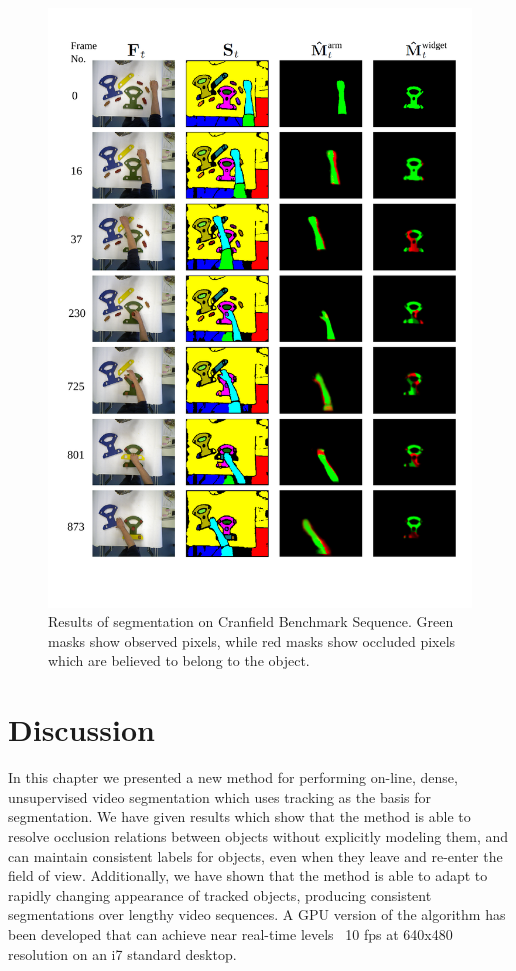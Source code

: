\begin{figure}[t]
\includegraphics[width=\linewidth]{figures/ECCV2012/Cranfield_Results.pdf}
  \caption[Results of Cranfield Sequence]{Results of segmentation on Cranfield Benchmark Sequence. Green masks show observed pixels, while red masks show occluded pixels which are believed to belong to the object.}
\label{fig:Cranfield_Results}
\end{figure}

\section{Discussion}
In this chapter we presented a new method for performing on-line, dense, unsupervised video segmentation which uses tracking as the basis for segmentation. We have given results which show that the method is able to resolve occlusion relations between objects without explicitly modeling them, and can maintain consistent labels for objects, even when they leave and re-enter the field of view. Additionally, we have shown that the method is able to adapt to rapidly changing appearance of tracked objects, producing consistent segmentations over lengthy video sequences. A GPU version of the algorithm has been developed that can achieve near real-time levels ~10 fps at 640x480 resolution on an i7 standard desktop. 

